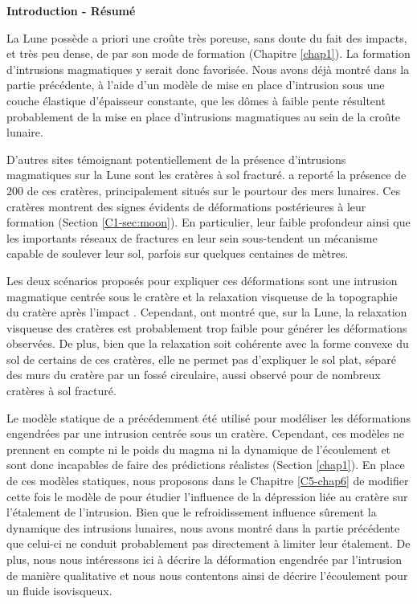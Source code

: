 \thispagestyle{plain}
\begin{flushleft}
 \Large \vspace{.5cm} \textbf{Introduction - Résumé}
\end{flushleft}

La Lune possède a priori une croûte très poreuse, sans doute du fait
des impacts, et très peu dense, de par son mode de formation (Chapitre
\ref{chap1}). La formation d’intrusions magmatiques y serait donc
favorisée. Nous avons déjà montré dans la partie précédente, à l’aide
d’un modèle de mise en place d’intrusion sous une couche élastique
d’épaisseur constante, que les dômes à faible pente résultent
probablement de la mise en place d'intrusions magmatiques au sein de
la croûte lunaire.

D’autres sites témoignant potentiellement de la présence d’intrusions
magmatiques sur la Lune sont les cratères à sol fracturé.
\citet{Schultz:1976kt} a reporté la présence de $200$ de ces cratères,
principalement situés sur le pourtour des mers lunaires. Ces cratères
montrent des signes évidents de déformations postérieures à leur
formation (Section \ref{C1-sec:moon}). En particulier, leur faible
profondeur ainsi que les importants réseaux de fractures en leur sein
sous-tendent un mécanisme capable de soulever leur sol, parfois sur
quelques centaines de mètres. 

Les deux scénarios proposés pour expliquer ces déformations sont une
intrusion magmatique centrée sous le cratère et la relaxation
visqueuse de la topographie du cratère après l’impact
\citep{Wichman:1996bj}. Cependant, \citet{Dombard:2001gs} ont montré
que, sur la Lune, la relaxation visqueuse des cratères est
probablement trop faible pour générer les déformations observées. De
plus, bien que la relaxation soit cohérente avec la forme convexe du
sol de certains de ces cratères, elle ne permet pas d’expliquer le sol
plat, séparé des murs du cratère par un fossé circulaire, aussi
observé pour de nombreux cratères à sol fracturé.

Le modèle statique de \citet{Pollard:1973ho} a précédemment été
utilisé pour modéliser les déformations engendrées par une intrusion
centrée sous un cratère. Cependant, ces modèles ne prennent en compte
ni le poids du magma ni la dynamique de l’écoulement et sont donc
incapables de faire des prédictions réalistes (Section
\ref{chap1}). En place de ces modèles statiques, nous proposons dans
le Chapitre \ref{C5-chap6} de modifier cette fois le modèle de
\citet{Michaut:2011kg} pour étudier l’influence de la dépression liée
au cratère sur l’étalement de l'intrusion. Bien que le
refroidissement influence sûrement la dynamique des intrusions
lunaires, nous avons montré dans la partie précédente que celui-ci ne
conduit probablement pas directement à limiter leur étalement. De
plus, nous nous intéressons ici à décrire la déformation engendrée par
l’intrusion de manière qualitative et nous nous contentons ainsi de
décrire l’écoulement pour un fluide isovisqueux.

